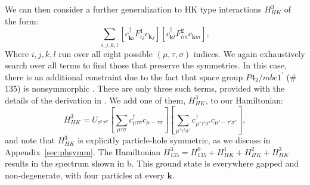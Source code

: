\documentclass[prb,aps,amssymb,twocolumn,notitlepage]{revtex4-2}
\begin{document}
We can then consider a further generalization to HK type interactions $H^{3}_{HK}$ of the form:
\begin{equation}
\sum_{i,j,k,l}\left[c^{\dagger}_{\mathbf{k}i}F^{1}_{ij}c_{\mathbf{k}j}\right]\left[c^{\dagger}_{\mathbf{k}l}F^{2}_{lm}c_{\mathbf{k}m}\right],
\end{equation}
Where $i,j,k,l$ run over all eight possible $(\mu,\tau,\sigma)$ indices. 
We again exhaustively search over all terms to find those that preserve the symmetries.
In this case, there is an additional constraint due to the fact that space group $P4_2/mbc1^\prime$ (\# 135) is nonsymmorphic \cite{wieder2018wallpaper}.
There are only three such terms, provided with the details of the derivation in . 
We add one of them, $H^{3}_{HK}$, to our Hamiltonian:
\begin{equation}
H^{3}_{HK}=U_{\tau^x\tau^x}\left[\sum_{\mu\tau\sigma}c^\dagger_{\mu\tau\sigma}c_{\mu-\tau\sigma}\right]
\left[\sum_{\mu'\tau'\sigma'}c^\dagger_{\mu'\tau'\sigma'}c_{\mu'-\tau'\sigma'}\right],
\end{equation}
and note that $H^{3}_{HK}$ is explicitly particle-hole symmetric, as we discuss in Appendix~\ref{sec:phsymm}. 
The Hamiltonian $H^{3}_{135}=H^{0}_{135}+H^{1}_{HK}+H^{2}_{HK}+H^{3}_{HK}$ results in the spectrum shown in b.
This ground state is everywhere gapped and non-degenerate, with four particles at every $\mathbf{k}$. 
\end{document}
